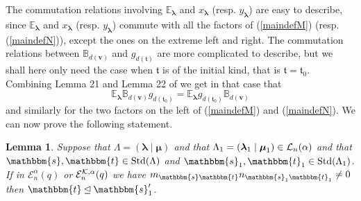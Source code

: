 \documentclass[10pt,a4,twoside,hidelinks,rm]{article}
\newcommand{\BB}{\mathbb{B}}
\newcommand\es{\mathbbm{s}}
\newcommand\et{\mathbbm{t}}
\newcommand\bv{\mathbf{v}}
\newcommand{\bT}{\pmb{\mathfrak{t}}}
\newcommand{\std}{{\rm Std}}
\newcommand{\Ea}{ {\mathcal E}_n^{\alpha}(q)}
\newcommand{\Eak}{ {\mathcal E}_n^{ {\cal K}, \alpha}(q)}
\newcommand\blambda{{\boldsymbol\lambda}}
\newcommand\be{\mathbb{E}}
\newcommand\bmu{{\boldsymbol\mu}}
\theoremstyle{plain}
\newtheorem{lem}[teo]{Lemma}
\begin{document}
The commutation relations involving $ { \be}^{}_{\blambda} $ and
$ x_{\blambda} $ (resp. $ y_{\blambda} $)
are easy to describe,
since $ { \be}^{}_{\blambda} $ and
$ x_{\blambda} $ (resp. $ y_{\blambda} $)
commute with all the factors of 
(\ref{maindefM}) (resp. (\ref{maindefN})), except the ones on the extreme left and right.
The commutation relations between
$ \BB^{}_{d(\bv)} $ and $ g^{}_{d(\bT)} $ are more complicated to describe, but we shall here only
need the case when $ \bT $ is of the initial kind, that is $ \bT= \bT_0$. 
Combining Lemma 21 and Lemma 22 of
\cite{ER} we get in that case that
\begin{equation}\label{morecommutation}
{ \be}^{}_{\blambda}  \BB^{}_{d(\bv)}  g^{}_{d(\bT_0)}=
{ \be}^{}_{\blambda}  g^{}_{d(\bT_0)} \BB^{}_{d(\bv)}  
\end{equation}
and similarly for the two factors on the left of 
(\ref{maindefM}) and (\ref{maindefN}). 
We can now prove the following statement. 
\begin{lem}{\label{secondduality}}
  Suppose that $ \Lambda =(\blambda \mid \bmu )  $ and that $  \Lambda_1 =
(\blambda_1 \mid \bmu_1 ) 
  \in {\cal L}_n(\alpha)$ and 
that $ \es, \et \in \std(\Lambda) $ and $ \es_1, \et_1 \in \std(\Lambda_1) $.
If in $ \Ea $ or $ \Eak $ we have 
$  m_{\es \et } n_{ \es _1 \et_1     } \neq 0 $ then $ \et \unlhd \es_1^{\prime}          $.
\end{lem}
\end{document}
